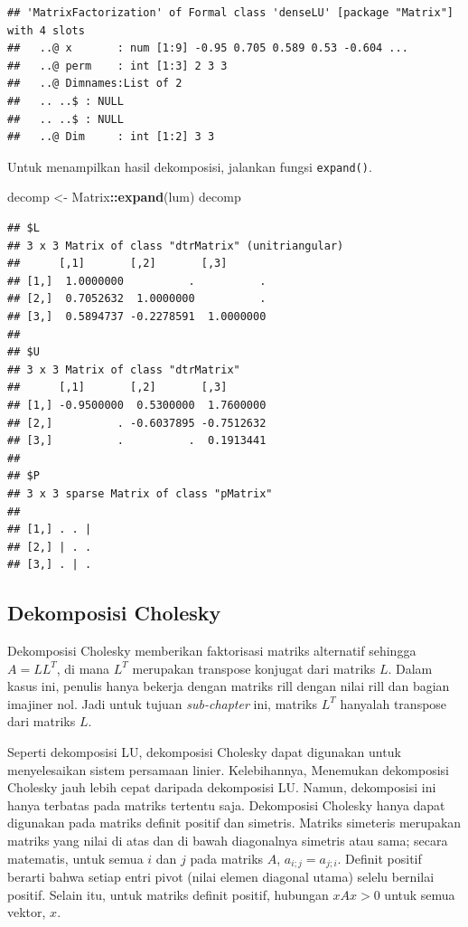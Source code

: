 \documentclass[]{book}
\newenvironment{Shaded}{\begin{snugshade}}{\end{snugshade}}
\newcommand{\KeywordTok}[1]{\textcolor[rgb]{0.13,0.29,0.53}{\textbf{#1}}}
\newcommand{\NormalTok}[1]{#1}
\newcommand{\OperatorTok}[1]{\textcolor[rgb]{0.81,0.36,0.00}{\textbf{#1}}}
\newcommand{\StringTok}[1]{\textcolor[rgb]{0.31,0.60,0.02}{#1}}
\theoremstyle{definition}
\theoremstyle{definition}
\theoremstyle{definition}
\theoremstyle{remark}
\begin{document}
\begin{verbatim}
## 'MatrixFactorization' of Formal class 'denseLU' [package "Matrix"] with 4 slots
##   ..@ x       : num [1:9] -0.95 0.705 0.589 0.53 -0.604 ...
##   ..@ perm    : int [1:3] 2 3 3
##   ..@ Dimnames:List of 2
##   .. ..$ : NULL
##   .. ..$ : NULL
##   ..@ Dim     : int [1:2] 3 3
\end{verbatim}

Untuk menampilkan hasil dekomposisi, jalankan fungsi \texttt{expand()}.

\begin{Shaded}
\begin{Highlighting}[]
\NormalTok{decomp <-}\StringTok{ }\NormalTok{Matrix}\OperatorTok{::}\KeywordTok{expand}\NormalTok{(lum)}
\NormalTok{decomp}
\end{Highlighting}
\end{Shaded}

\begin{verbatim}
## $L
## 3 x 3 Matrix of class "dtrMatrix" (unitriangular)
##      [,1]       [,2]       [,3]      
## [1,]  1.0000000          .          .
## [2,]  0.7052632  1.0000000          .
## [3,]  0.5894737 -0.2278591  1.0000000
## 
## $U
## 3 x 3 Matrix of class "dtrMatrix"
##      [,1]       [,2]       [,3]      
## [1,] -0.9500000  0.5300000  1.7600000
## [2,]          . -0.6037895 -0.7512632
## [3,]          .          .  0.1913441
## 
## $P
## 3 x 3 sparse Matrix of class "pMatrix"
##           
## [1,] . . |
## [2,] | . .
## [3,] . | .
\end{verbatim}

\hypertarget{dekomposisi-cholesky}{%
\subsection{Dekomposisi Cholesky}\label{dekomposisi-cholesky}}

Dekomposisi Cholesky memberikan faktorisasi matriks alternatif sehingga \(A = LL^T\), di mana \(L^T\) merupakan transpose konjugat dari matriks \(L\). Dalam kasus ini, penulis hanya bekerja dengan matriks rill dengan nilai rill dan bagian imajiner nol. Jadi untuk tujuan \emph{sub-chapter} ini, matriks \(L^T\) hanyalah transpose dari matriks \(L\).

Seperti dekomposisi LU, dekomposisi Cholesky dapat digunakan untuk menyelesaikan sistem persamaan linier. Kelebihannya, Menemukan dekomposisi Cholesky jauh lebih cepat daripada dekomposisi LU. Namun, dekomposisi ini hanya terbatas pada matriks tertentu saja. Dekomposisi Cholesky hanya dapat digunakan pada matriks definit positif dan simetris. Matriks simeteris merupakan matriks yang nilai di atas dan di bawah diagonalnya simetris atau sama; secara matematis, untuk semua \(i\) dan \(j\) pada matriks \(A\), \(a_{i;j}=a_{j;i}\). Definit positif berarti bahwa setiap entri pivot (nilai elemen diagonal utama) selelu bernilai positif. Selain itu, untuk matriks definit positif, hubungan \(xAx>0\) untuk semua vektor, \(x\).
\end{document}
